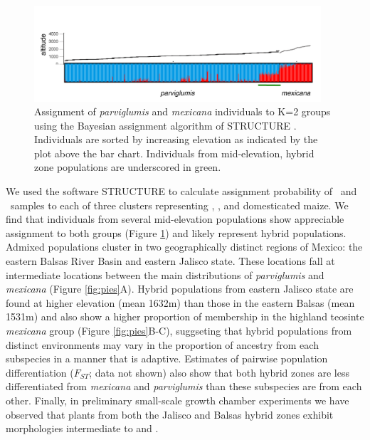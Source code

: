 \begin{figure}[t] 
  \centering
   \includegraphics[width=0.95\textwidth]{structure.pdf}
    \caption{Assignment of \emph{parviglumis} and \emph{mexicana} individuals to K=2 groups using the Bayesian assignment algorithm of STRUCTURE \citep{Pritchard2000}.  Individuals are sorted by increasing elevation as indicated by the plot above the bar chart. Individuals from mid-elevation, hybrid zone populations are underscored in green.} 
\label{fig:structure}
\end{figure}

We used the software STRUCTURE \citep{Pritchard2000} to calculate assignment probability of \zp\ and \zm\ samples to each of three clusters representing \zp, \zm, and domesticated maize.  
We find that individuals from several mid-elevation populations show appreciable assignment to both groups (Figure \ref{fig:structure}) and likely represent hybrid populations.  
Admixed populations cluster in two geographically distinct regions of Mexico: the eastern Balsas River Basin and eastern Jalisco state.
These locations fall at intermediate locations between the main distributions of \emph{parviglumis} and \emph{mexicana} (Figure \ref{fig:pies}A).
Hybrid populations from eastern Jalisco state are found at higher elevation (mean 1632m) than those in the eastern Balsas (mean 1531m) and also show a higher proportion of membership in the highland teosinte \emph{mexicana} group (Figure \ref{fig:pies}B-C), suggseting that hybrid populations from distinct environments may vary in the proportion of ancestry from each subspecies in a manner that is adaptive.
Estimates of pairwise population differentiation ($F_{ST}$; data not shown) also show that both hybrid zones are less differentiated from \emph{mexicana} and \emph{parviglumis} than these subspecies are from each other.
Finally, in preliminary small-scale growth chamber experiments we have observed that plants from both the Jalisco and Balsas hybrid zones exhibit morphologies intermediate to \zp{} and \zm{}. 

